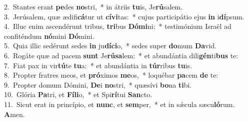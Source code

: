 {2.~}Stantes erant \textbf{pe}des \textbf{no}stri,~* in átriis \textbf{tu}is, Je\textbf{rú}salem.\\
{3.~}Jerúsalem, quæ ædifi\textbf{cá}tur ut \textbf{cí}\textbf{vi}tas:~* cujus participátio ejus \textbf{in} i\textbf{dí}psum.\\
{4.~}Illuc enim ascendérunt tribus, \textbf{tri}bus \textbf{Dó}\textbf{mi}ni:~* testimónium Israël ad confiténdum \textbf{nó}mini \textbf{Dó}mini.\\
{5.~}Quia illic sedérunt sedes \textbf{in} ju\textbf{dí}\textbf{ci}o,~* sedes super \textbf{do}mum \textbf{Da}vid.\\
{6.~}Rogáte quæ ad pacem \textbf{sunt} Je\textbf{rú}\textbf{sa}lem:~* et abundántia dili\textbf{gén}ti\textbf{bus} te:\\
{7.~}Fiat pax in vir\textbf{tú}te \textbf{tu}a:~* et abundántia in \textbf{túr}ribus \textbf{tu}is.\\
{8.~}Propter fratres meos, et \textbf{pró}ximos \textbf{me}os,~* loquébar \textbf{pa}cem \textbf{de} te:\\
{9.~}Propter domum Dómini, \textbf{De}i \textbf{no}stri,~* quæsívi \textbf{bo}na \textbf{ti}bi.\\
{10.~}Glória \textbf{Pa}tri, et \textbf{Fí}\textbf{li}o,~* et Spi\textbf{rí}tui \textbf{San}cto.\\
{11.~}Sicut erat in princípio, et \textbf{nunc}, et \textbf{sem}per,~* et in sǽcula sæcu\textbf{ló}rum. \textbf{A}men.\\
